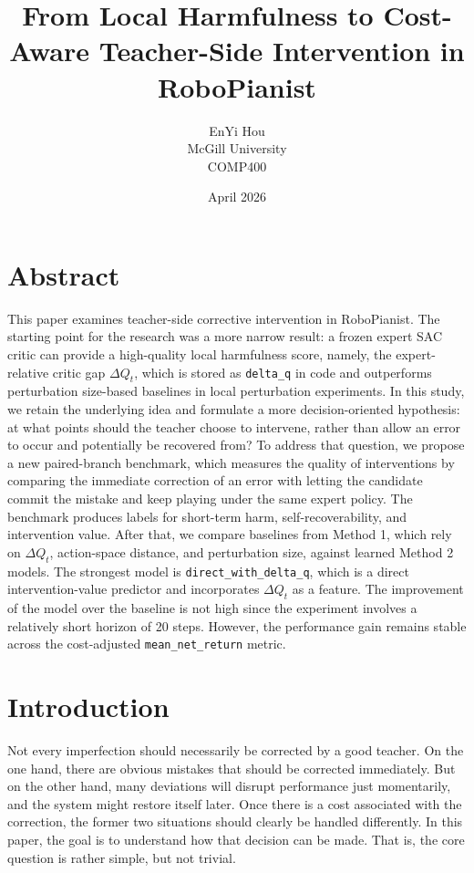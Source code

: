 \documentclass[11pt]{article}
\title{From Local Harmfulness to Cost-Aware Teacher-Side Intervention in RoboPianist}
\author{EnYi Hou \\ McGill University \\ COMP400}
\date{April 2026}
\begin{document}
\maketitle

\section{Abstract}

This paper examines teacher-side corrective intervention in RoboPianist. The starting point for the research was a more narrow result: a frozen expert SAC critic can provide a high-quality local harmfulness score, namely, the expert-relative critic gap \(\Delta Q_t\), which is stored as \texttt{delta\_q} in code and outperforms perturbation size-based baselines in local perturbation experiments. In this study, we retain the underlying idea and formulate a more decision-oriented hypothesis: at what points should the teacher choose to intervene, rather than allow an error to occur and potentially be recovered from? To address that question, we propose a new paired-branch benchmark, which measures the quality of interventions by comparing the immediate correction of an error with letting the candidate commit the mistake and keep playing under the same expert policy. The benchmark produces labels for short-term harm, self-recoverability, and intervention value. After that, we compare baselines from Method 1, which rely on \(\Delta Q_t\), action-space distance, and perturbation size, against learned Method 2 models. The strongest model is \texttt{direct\_with\_delta\_q}, which is a direct intervention-value predictor and incorporates \(\Delta Q_t\) as a feature. The improvement of the model over the baseline is not high since the experiment involves a relatively short horizon of 20 steps. However, the performance gain remains stable across the cost-adjusted \texttt{mean\_net\_return} metric.

\section{Introduction}

Not every imperfection should necessarily be corrected by a good teacher. On the one hand, there are obvious mistakes that should be corrected immediately. But on the other hand, many deviations will disrupt performance just momentarily, and the system might restore itself later. Once there is a cost associated with the correction, the former two situations should clearly be handled differently. In this paper, the goal is to understand how that decision can be made. That is, the core question is rather simple, but not trivial.
\end{document}
